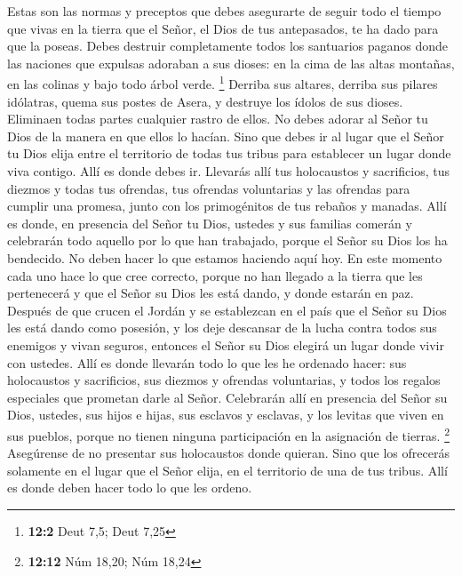  Estas son las normas y preceptos que debes asegurarte de
seguir todo el tiempo que vivas en la tierra que el Señor, el Dios de
tus antepasados, te ha dado para que la poseas.  Debes
destruir completamente todos los santuarios paganos donde las naciones
que expulsas adoraban a sus dioses: en la cima de las altas montañas, en
las colinas y bajo todo árbol verde. \footnote{\textbf{12:2} Deut 7,5;
  Deut 7,25}  Derriba sus altares, derriba sus pilares
idólatras, quema sus postes de Asera, y destruye los ídolos de sus
dioses. Eliminaen todas partes cualquier rastro de ellos. 
No debes adorar al Señor tu Dios de la manera en que ellos lo hacían.
 Sino que debes ir al lugar que el Señor tu Dios elija
entre el territorio de todas tus tribus para establecer un lugar donde
viva contigo. Allí es donde debes ir.  Llevarás allí tus
holocaustos y sacrificios, tus diezmos y todas tus ofrendas, tus
ofrendas voluntarias y las ofrendas para cumplir una promesa, junto con
los primogénitos de tus rebaños y manadas.  Allí es donde,
en presencia del Señor tu Dios, ustedes y sus familias comerán y
celebrarán todo aquello por lo que han trabajado, porque el Señor su
Dios los ha bendecido.  No deben hacer lo que estamos
haciendo aquí hoy. En este momento cada uno hace lo que cree correcto,
 porque no han llegado a la tierra que les pertenecerá y
que el Señor su Dios les está dando, y donde estarán en paz.
 Después de que crucen el Jordán y se establezcan en el
país que el Señor su Dios les está dando como posesión, y los deje
descansar de la lucha contra todos sus enemigos y vivan seguros,
 entonces el Señor su Dios elegirá un lugar donde vivir
con ustedes. Allí es donde llevarán todo lo que les he ordenado hacer:
sus holocaustos y sacrificios, sus diezmos y ofrendas voluntarias, y
todos los regalos especiales que prometan darle al Señor.
 Celebrarán allí en presencia del Señor su Dios, ustedes,
sus hijos e hijas, sus esclavos y esclavas, y los levitas que viven en
sus pueblos, porque no tienen ninguna participación en la asignación de
tierras. \footnote{\textbf{12:12} Núm 18,20; Núm 18,24} 
Asegúrense de no presentar sus holocaustos donde quieran.
 Sino que los ofrecerás solamente en el lugar que el
Señor elija, en el territorio de una de tus tribus. Allí es donde deben
hacer todo lo que les ordeno.


